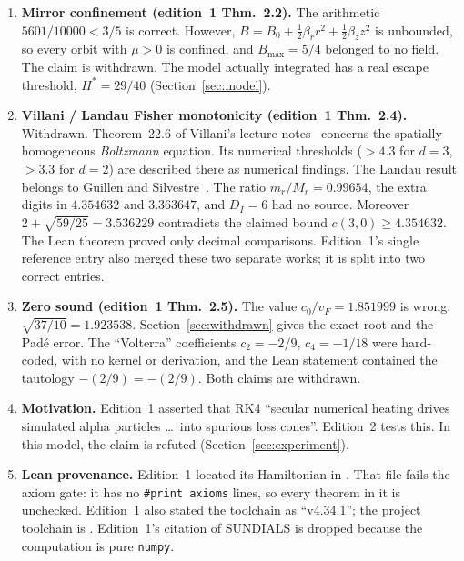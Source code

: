 \documentclass[11pt,a4paper]{article}
\theoremstyle{definition}
\newcommand{\Hs}{H^{*}}
\begin{document}
\begin{enumerate}
  \item \textbf{Mirror confinement (edition~1 Thm.~2.2).} The arithmetic $5601/10000<3/5$ is correct. However, $B=B_0+\tfrac12\beta_r r^2+\tfrac12\beta_z z^2$ is unbounded, so every orbit with $\mu>0$ is confined, and $B_{\max}=5/4$ belonged to no field. The claim is withdrawn. The model actually integrated has a real escape threshold, $\Hs=29/40$ (Section~\ref{sec:model}).
  \item \textbf{Villani / Landau Fisher monotonicity (edition~1 Thm.~2.4).} Withdrawn. Theorem~22.6 of Villani's lecture notes~\cite{Villani2025} concerns the spatially homogeneous \emph{Boltzmann} equation. Its numerical thresholds ($>4.3$ for $d=3$, $>3.3$ for $d=2$) are described there as numerical findings. The Landau result belongs to Guillen and Silvestre~\cite{GuillenSilvestre2025}. The ratio $m_r/M_r=0.99654$, the extra digits in $4.354632$ and $3.363647$, and $D_I=6$ had no source. Moreover $2+\sqrt{59/25}=3.536229$ contradicts the claimed bound $c(3,0)\ge 4.354632$. The Lean theorem proved only decimal comparisons. Edition~1's single reference entry also merged these two separate works; it is split into two correct entries.
  \item \textbf{Zero sound (edition~1 Thm.~2.5).} The value $c_0/v_F=1.851999$ is wrong: $\sqrt{37/10}=1.923538$. Section~\ref{sec:withdrawn} gives the exact root and the Pad\'e error. The ``Volterra'' coefficients $c_2=-2/9$, $c_4=-1/18$ were hard-coded, with no kernel or derivation, and the Lean statement contained the tautology $-(2/9)=-(2/9)$. Both claims are withdrawn.
  \item \textbf{Motivation.} Edition~1 asserted that RK4 ``secular numerical heating drives simulated alpha particles \dots\ into spurious loss cones''. Edition~2 tests this. In this model, the claim is refuted (Section~\ref{sec:experiment}).
  \item \textbf{Lean provenance.} Edition~1 located its Hamiltonian in . That file fails the axiom gate: it has no \texttt{\#print axioms} lines, so every theorem in it is unchecked. Edition~1 also stated the toolchain as ``v4.34.1''; the project toolchain is . Edition~1's citation of SUNDIALS is dropped because the computation is pure \texttt{numpy}.
\end{enumerate}
\end{document}
